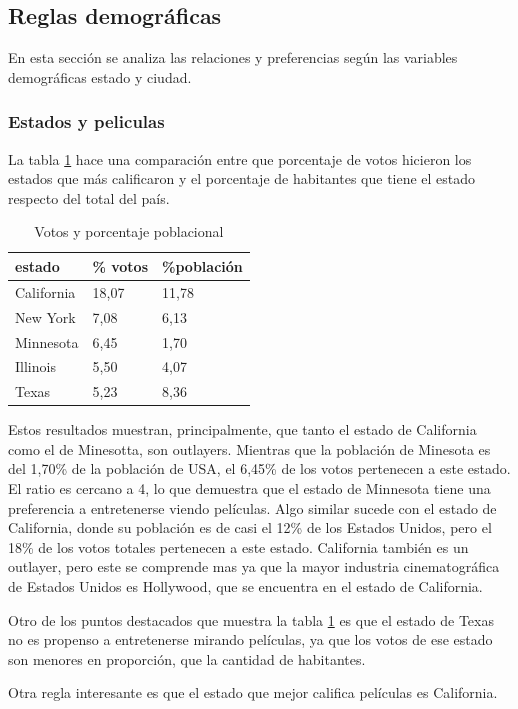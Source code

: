\documentclass[journal]{IEEEtran}
\begin{document}
\subsection{Reglas demográficas}
En esta sección se analiza las relaciones y preferencias según las variables 
demográficas estado y ciudad. 

\subsubsection{Estados y peliculas}
La tabla \ref{table_state_population} hace una comparación entre que porcentaje
de votos hicieron los estados que más calificaron y el porcentaje de habitantes
que tiene el estado respecto del total del país.

\begin{table}[ht!]
\caption{Votos y porcentaje poblacional}
\label{table_state_population}
\centering
\begin{tabular}{l l l}
estado & \% votos & \%población  \\
\hline
California & 18,07 & 11,78 \\
New York & 7,08 & 6,13 \\
Minnesota & 6,45 & 1,70 \\
Illinois & 5,50 & 4,07 \\
Texas & 5,23 & 8,36
\end{tabular}
\end{table}

Estos resultados muestran, principalmente, que tanto el estado de California
como el de Minesotta, son outlayers. Mientras que la población de
Minesota es del 1,70\% de la población de USA, el 6,45\% de los votos pertenecen
a este estado. El ratio es cercano a 4, lo que demuestra
que el estado de Minnesota tiene una preferencia a entretenerse viendo películas.
Algo similar sucede con el estado de California, donde su población es de casi el
12\% de los Estados Unidos, pero el 18\% de los votos totales pertenecen a este
estado. California también es un outlayer, pero este se comprende mas ya que la
mayor industria cinematográfica de Estados Unidos es Hollywood, que se encuentra
en el estado de California.

Otro de los puntos destacados que muestra la tabla \ref{table_state_population} es
que el estado de Texas no es propenso a entretenerse mirando películas, ya que los
votos de ese estado son menores en proporción, que la cantidad de habitantes.

Otra regla interesante es que el estado que mejor califica películas es California.
\end{document}
